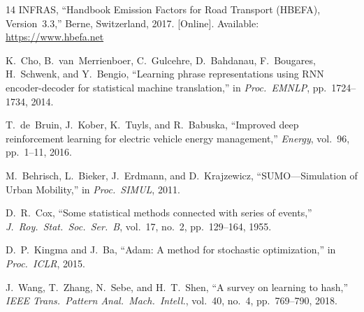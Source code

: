 \documentclass[journal,letterpaper,10pt]{IEEEtran}
\theoremstyle{definition}
\theoremstyle{remark}
\begin{document}
\begin{thebibliography}{14}
INFRAS,
``Handbook Emission Factors for Road Transport (HBEFA),
  Version~3.3,''
  Berne, Switzerland, 2017.
  [Online]. Available: \url{https://www.hbefa.net}

K.~Cho, B.~van~Merrienboer, C.~Gulcehre, D.~Bahdanau,
  F.~Bougares, H.~Schwenk, and Y.~Bengio,
``Learning phrase representations using RNN encoder-decoder for
  statistical machine translation,''
  in \emph{Proc.\ EMNLP}, pp.~1724--1734, 2014.

T.~de~Bruin, J.~Kober, K.~Tuyls, and R.~Babuska,
``Improved deep reinforcement learning for electric vehicle energy
  management,''
  \emph{Energy}, vol.~96, pp.~1--11, 2016.

M.~Behrisch, L.~Bieker, J.~Erdmann, and D.~Krajzewicz,
``SUMO---Simulation of Urban Mobility,''
  in \emph{Proc.\ SIMUL}, 2011.

D.~R.~Cox,
``Some statistical methods connected with series of events,''
  \emph{J.\ Roy.\ Stat.\ Soc.\ Ser.~B}, vol.~17, no.~2,
  pp.~129--164, 1955.

D.~P.~Kingma and J.~Ba,
``Adam: A method for stochastic optimization,''
  in \emph{Proc.\ ICLR}, 2015.

J.~Wang, T.~Zhang, N.~Sebe, and H.~T.~Shen,
``A survey on learning to hash,''
  \emph{IEEE Trans.\ Pattern Anal.\ Mach.\ Intell.},
  vol.~40, no.~4, pp.~769--790, 2018.

\end{thebibliography}
\end{document}
